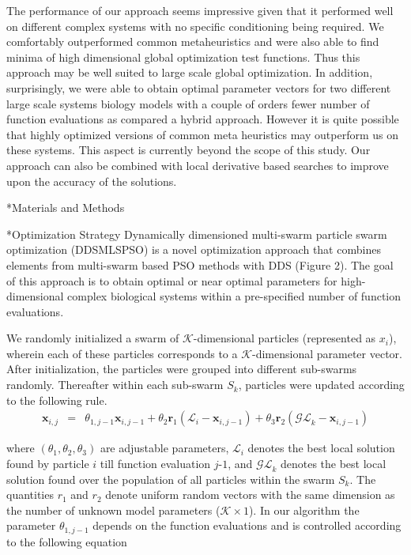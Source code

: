 \documentclass[12pt]{article}
\makeatletter
\renewcommand\subsection{\@startsection
	{subsection}{2}{0mm}
	{-0.05in}
	{-0.5\baselineskip}
	{\normalfont\normalsize\bfseries}}
\renewcommand\section{\@startsection
	{subsection}{2}{0mm}
	{-0.2in}
	{0.05\baselineskip}
	{\normalfont\large\bfseries}}
\makeatother
\begin{document}
The performance of our approach seems impressive given that it performed well on different complex systems with no specific conditioning being required. We comfortably outperformed common metaheuristics and were also able to find minima of high dimensional global optimization test functions. Thus this approach may be well suited to large scale global optimization. In addition, surprisingly, we were able to obtain optimal parameter vectors for two different large scale systems biology models with a couple of orders fewer number of function evaluations as compared a hybrid approach. However it is quite possible that highly optimized versions of common meta heuristics may outperform us on these systems. This aspect is currently beyond the scope of this study. Our approach can also be combined with local derivative based searches to improve upon the accuracy of the solutions.  

\clearpage
\section*{Materials and Methods}
\subsection*{Optimization Strategy}
Dynamically dimensioned multi-swarm particle swarm optimization (DDSMLSPSO) is a novel optimization approach that combines elements from multi-swarm based PSO methods  with DDS (Figure 2). The goal of this approach is to obtain optimal or near optimal parameters for high-dimensional complex biological systems within a pre-specified number of function evaluations. 

 We randomly initialized a swarm of $\mathcal{K}$-dimensional particles (represented as ${x}_{i}$), wherein each of these particles corresponds to a $\mathcal{K}$-dimensional parameter vector. After initialization, the particles were grouped into different sub-swarms randomly. Thereafter within each sub-swarm ${S}_{k}$,  particles were updated according to the following rule.
\begin{eqnarray}
	\mathbf{x}_{i,j} &=&\theta_{1,j-1}\mathbf{x}_{i,j-1} + \theta_{2}\mathbf{r}_{1}\left(\mathcal{L}_{i} - \mathbf{x}_{i,j-1}\right) + \theta_{3}\mathbf{r}_{2}\left(\mathcal{GL}_{k} - \mathbf{x}_{i,j-1}\right) 
\end{eqnarray}

where $\left(\theta_{1},\theta_{2},\theta_{3}\right)$ are adjustable parameters, $\mathcal{L}_{i}$ denotes the best local solution found by particle $i$ till function evaluation $j$-$1$, and
$\mathcal{GL}_{k}$ denotes the best local solution found over the population of all particles within the swarm ${S}_{k}$. The quantities $r_{1}$ and $r_{2}$ denote uniform random vectors with the same dimension as the number of unknown model
parameters ($\mathcal{K}\times{1}$). In our algorithm the parameter $\theta_{1,j-1}$ depends on the function evaluations and is controlled according to the following equation
\end{document}
